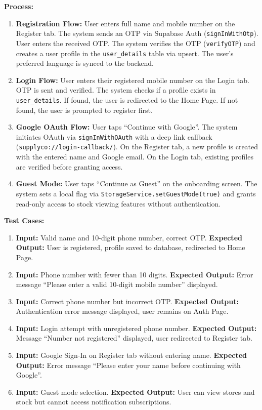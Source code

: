 \textbf{Process:}
\begin{enumerate}
    \item \textbf{Registration Flow:} User enters full name and mobile number on the Register tab. The system sends an OTP via Supabase Auth (\texttt{signInWithOtp}). User enters the received OTP. The system verifies the OTP (\texttt{verifyOTP}) and creates a user profile in the \texttt{user\_details} table via upsert. The user's preferred language is synced to the backend.

    \item \textbf{Login Flow:} User enters their registered mobile number on the Login tab. OTP is sent and verified. The system checks if a profile exists in \texttt{user\_details}. If found, the user is redirected to the Home Page. If not found, the user is prompted to register first.

    \item \textbf{Google OAuth Flow:} User taps ``Continue with Google''. The system initiates OAuth via \texttt{signInWithOAuth} with a deep link callback \newline (\texttt{supplyco://login-callback/}). On the Register tab, a new profile is created with the entered name and Google email. On the Login tab, existing profiles are verified before granting access.

    \item \textbf{Guest Mode:} User taps ``Continue as Guest'' on the onboarding screen. The system sets a local flag via \texttt{StorageService.setGuestMode(true)} and grants read-only access to stock viewing features without authentication.
\end{enumerate}

\textbf{Test Cases:}
\begin{enumerate}
    \item \textbf{Input:} Valid name and 10-digit phone number, correct OTP. \textbf{Expected Output:} User is registered, profile saved to database, redirected to Home Page.

    \item \textbf{Input:} Phone number with fewer than 10 digits. \textbf{Expected Output:} Error message ``Please enter a valid 10-digit mobile number'' displayed.

    \item \textbf{Input:} Correct phone number but incorrect OTP. \textbf{Expected Output:} Authentication error message displayed, user remains on Auth Page.

    \item \textbf{Input:} Login attempt with unregistered phone number. \textbf{Expected Output:} Message ``Number not registered'' displayed, user redirected to Register tab.

    \item \textbf{Input:} Google Sign-In on Register tab without entering name. \textbf{Expected Output:} Error message ``Please enter your name before continuing with Google''.

    \item \textbf{Input:} Guest mode selection. \textbf{Expected Output:} User can view stores and stock but cannot access notification subscriptions.
\end{enumerate}

